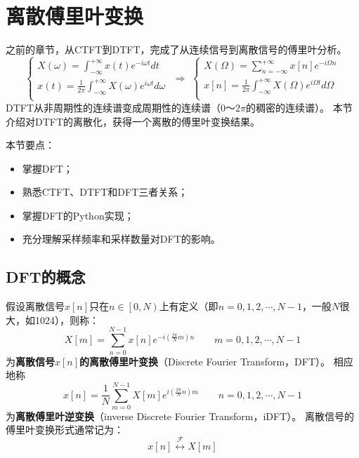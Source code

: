 \section{离散傅里叶变换}

之前的章节，从CTFT到DTFT，完成了从连续信号到离散信号的傅里叶分析。
\[
\begin{cases}
	X\left( \omega \right) =\int_{-\infty}^{+\infty}{x\left( t \right) e^{-i\omega t}dt}\\
	x\left( t \right) =\frac{1}{2\pi}\int_{-\infty}^{+\infty}{X\left( \omega \right) e^{i\omega t}d\omega}\\
\end{cases}\,\,  \Rightarrow \,\,  \begin{cases}
	X\left( \varOmega \right) =\sum_{n=-\infty}^{+\infty}{x\left[ n \right] e^{-i\varOmega n}}\\
	x\left[ n \right] =\frac{1}{2\pi}\int_{-\infty}^{+\infty}{X\left( \varOmega \right) e^{i\varOmega t}d\varOmega}\\
\end{cases}
\]
DTFT从非周期性的连续谱变成周期性的连续谱（$0\text{～}2\pi $的稠密的连续谱）。
本节介绍对DTFT的离散化，获得一个离散的傅里叶变换结果。

本节要点：
\begin{itemize}
    \item 掌握DFT；
    \item 熟悉CTFT、DTFT和DFT三者关系；
    \item 掌握DFT的Python实现；
    \item 充分理解采样频率和采样数量对DFT的影响。
\end{itemize}

\subsection{DFT的概念}

\begin{definition}[离散傅里叶变换]
假设离散信号$x\left[ n \right] $只在$n\in \left[ 0,N \right) $上有定义（即$n=0,1,2,\cdots ,N-1$，一般$N$很大，如1024），则称：
\[
X\left[ m \right] =\sum_{n=0}^{N-1}{x\left[ n \right] e^{-i\left( \frac{2\pi}{N}m \right) n}} \qquad m=0,1,2,\cdots ,N-1
\]
为{\bf 离散信号$x\left[ n \right] $的离散傅里叶变换}（Discrete Fourier Transform，DFT）。
相应地称
\[
x\left[ n \right] =\frac{1}{N}\sum_{m=0}^{N-1}{X\left[ m \right] e^{i\left( \frac{2\pi}{N}n \right) m}} \qquad n=0,1,2,\cdots ,N-1
\]
为{\bf 离散傅里叶逆变换}（inverse Discrete Fourier Transform，iDFT）。
离散信号的傅里叶变换形式通常记为：
\[
x\left[ n \right] \overset{\mathscr{F}}{\leftrightarrow}X\left[ m \right]
\]
\end{definition}

